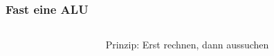 \documentclass[t,aspectratio=169]{beamer}
\begin{document}
\begin{frame}
  \frametitle{Fast eine ALU}

    \begin{columns}[T]
    \begin{column}{.45\textwidth}
    \end{column}
    \begin{column}{.45\textwidth}
      Prinzip: Erst rechnen, dann aussuchen


\end{column}
\end{columns}
\end{frame}
\end{document}
